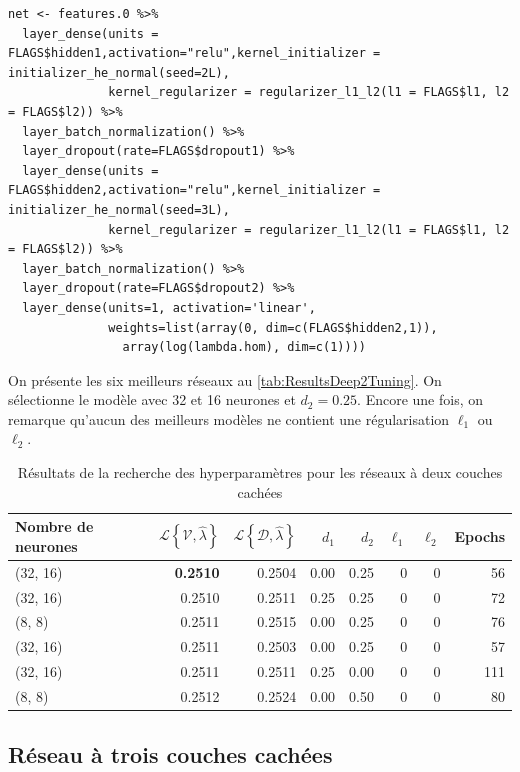 \begin{lstlisting}[caption = {Définition de la structure du réseau à deux couches cachées}, label= code:deep2]
 net <- features.0 %>%
  layer_dense(units = FLAGS$hidden1,activation="relu",kernel_initializer = initializer_he_normal(seed=2L),
              kernel_regularizer = regularizer_l1_l2(l1 = FLAGS$l1, l2 = FLAGS$l2)) %>% 
  layer_batch_normalization() %>%
  layer_dropout(rate=FLAGS$dropout1) %>% 
  layer_dense(units = FLAGS$hidden2,activation="relu",kernel_initializer = initializer_he_normal(seed=3L),
              kernel_regularizer = regularizer_l1_l2(l1 = FLAGS$l1, l2 = FLAGS$l2)) %>% 
  layer_batch_normalization() %>%
  layer_dropout(rate=FLAGS$dropout2) %>% 
  layer_dense(units=1, activation='linear', 
              weights=list(array(0, dim=c(FLAGS$hidden2,1)), 
              	array(log(lambda.hom), dim=c(1))))
\end{lstlisting}


On présente les six meilleurs réseaux au \autoref{tab:ResultsDeep2Tuning}.  On sélectionne le modèle avec 32 et 16 neurones et $d_2=0.25$. Encore une fois, on remarque qu'aucun des meilleurs modèles ne contient une régularisation $\ell_1$ ou $\ell_2$.

\begin{table}
\centering
\caption{\label{tab:ResultsDeep2Tuning}Résultats de la recherche des hyperparamètres pour les réseaux à deux couches cachées}
\begin{tabularx}{0.8\textwidth}{Xrrrrrrr}
\toprule
Nombre \newline de neurones & $\mathcal{L}\left\{\mathcal{V},\hat{\lambda} \right\} $ & $\mathcal{L}\left\{\mathcal{D},\hat{\lambda} \right\} $ & $d_1$ & $d_2$ & $\ell_1$ & $\ell_2$ & Epochs\\
\midrule
(32, 16) & \textbf{0.2510} & 0.2504 & 0.00 & 0.25 & 0 & 0 & 56\\
(32, 16) & 0.2510 & 0.2511 & 0.25 & 0.25 & 0 & 0 & 72\\
(8, 8) & 0.2511 & 0.2515 & 0.00 & 0.25 & 0 & 0 & 76\\
(32, 16) & 0.2511 & 0.2503 & 0.00 & 0.25 & 0 & 0 & 57\\
(32, 16) & 0.2511 & 0.2511 & 0.25 & 0.00 & 0 & 0 & 111\\
(8, 8) & 0.2512 & 0.2524 & 0.00 & 0.50 & 0 & 0 & 80\\
\bottomrule
\end{tabularx}
\end{table}

\subsection{Réseau à trois couches cachées}
\label{subsec:Deep3}

